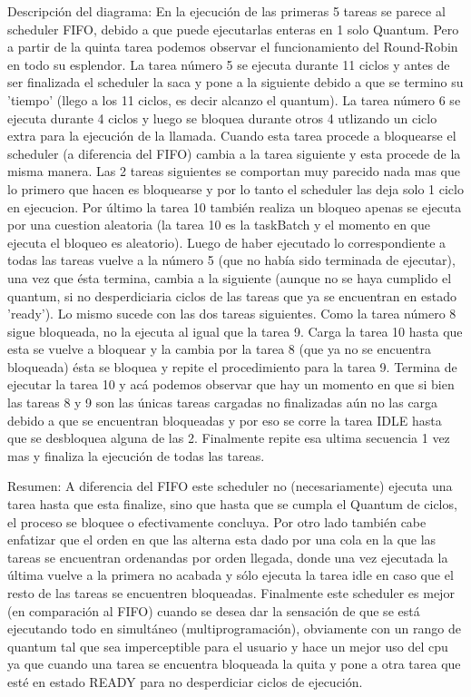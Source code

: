 Descripción del diagrama:
En la ejecución de las primeras 5 tareas se parece al scheduler FIFO, debido a que puede ejecutarlas enteras en 1 solo Quantum. Pero a partir de la quinta tarea podemos observar el funcionamiento del Round-Robin en todo su esplendor.
La tarea número 5 se ejecuta durante 11 ciclos y antes de ser finalizada el scheduler la saca y pone a la siguiente debido a que se termino su 'tiempo' (llego a los 11 ciclos, es decir alcanzo el quantum).
La tarea número 6 se ejecuta durante 4 ciclos y luego se bloquea durante otros 4 utlizando un ciclo extra para la ejecución de la llamada. Cuando esta tarea procede a bloquearse el scheduler (a diferencia del FIFO) cambia a la tarea siguiente y esta procede de la misma manera.
Las 2 tareas siguientes se comportan muy parecido nada mas que lo primero que hacen es bloquearse y por lo tanto el scheduler las deja solo 1 ciclo en ejecucion.
Por último la tarea 10 también realiza un bloqueo apenas se ejecuta por una cuestion aleatoria (la tarea 10 es la taskBatch y el momento en que ejecuta el bloqueo es aleatorio).
Luego de haber ejecutado lo correspondiente a todas las tareas vuelve a la número 5 (que no había sido terminada de ejecutar), una vez que ésta termina, cambia a la siguiente (aunque no se haya cumplido el quantum, si no desperdiciaria ciclos de las tareas que ya se encuentran en estado 'ready'). Lo mismo sucede con las dos tareas siguientes.
Como la tarea número 8 sigue bloqueada, no la ejecuta al igual que la tarea 9.
Carga la tarea 10 hasta que esta se vuelve a bloquear y la cambia por la tarea 8 (que ya no se encuentra bloqueada) ésta se bloquea y repite el procedimiento para la tarea 9. 
Termina de ejecutar la tarea 10 y acá podemos observar que hay un momento en que si bien las tareas 8 y 9 son las únicas tareas cargadas no finalizadas aún no las carga debido a que se encuentran bloqueadas y por eso se corre la tarea IDLE hasta que se desbloquea alguna de las 2.
Finalmente repite esa ultima secuencia 1 vez mas y finaliza la ejecución de todas las tareas.

Resumen:
A diferencia del FIFO este scheduler no (necesariamente) ejecuta una tarea hasta que esta finalize, sino que hasta que se cumpla el Quantum de ciclos, el proceso se bloquee o efectivamente concluya. Por otro lado también cabe enfatizar que el orden en que las alterna esta dado por una cola en la que las tareas se encuentran ordenandas por orden llegada, donde una vez ejecutada la última vuelve a la primera no acabada y sólo ejecuta la tarea idle en caso que el resto de las tareas se encuentren bloqueadas.
Finalmente este scheduler es mejor (en comparación al FIFO) cuando se desea dar la sensación de que se está ejecutando todo en simultáneo (multiprogramación), obviamente con un rango de quantum tal que sea imperceptible para el usuario y hace un mejor uso del cpu ya que cuando una tarea se encuentra bloqueada la quita y pone a otra tarea que esté en estado READY para no desperdiciar ciclos de ejecución.
